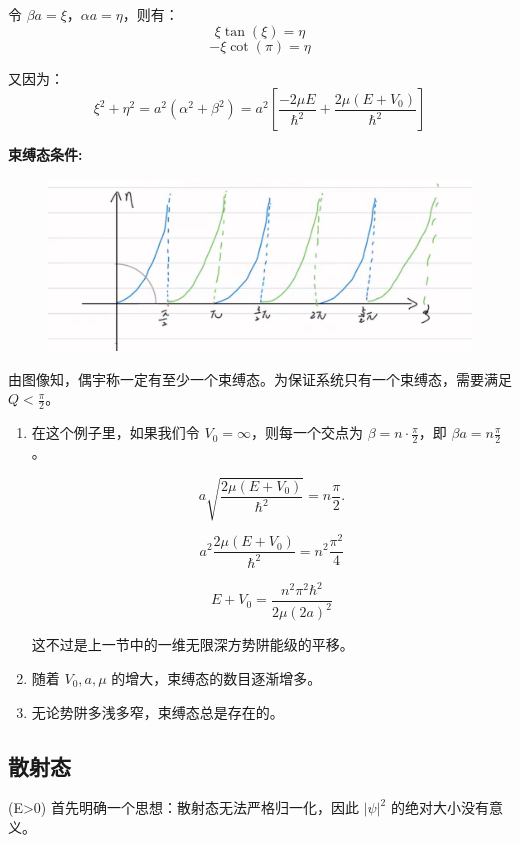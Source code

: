 \documentclass[lang=cn,10pt]{elegantbook}
\begin{document}
\begin{solution}
令 \(\beta a = \xi\)，\(\alpha a = \eta\)，则有：
\[
\xi \tan(\xi) = \eta
\]
\[
-\xi \cot(\pi) = \eta
\]

又因为：
\[
\xi^2 + \eta^2 = a^2 \left( \alpha^2 + \beta^2 \right) = a^2 \left[ \frac{-2\mu E}{\hbar^2} + \frac{2\mu (E + V_0)}{\hbar^2} \right]
\]
	
	\textbf{束缚态条件:}
	
	\begin{figure}[H]
		\centering
		\includegraphics[width=0.7\linewidth]{figure/screenshot0025}
	\end{figure}
	
	由图像知，偶宇称一定有至少一个束缚态。为保证系统只有一个束缚态，需要满足 $Q < \frac{\pi}{2}$。
	
	\begin{enumerate}
		\item 在这个例子里，如果我们令 $V_0 = \infty$，则每一个交点为 $\beta = n \cdot \frac{\pi}{2}$，即 $\beta a = n \frac{\pi}{2}$。
		
		\[
		a \sqrt{\frac{2\mu(E+V_0)}{\hbar^2}} = n \frac{\pi}{2}.
		\]
		
		\[
		a^2 \frac{2\mu(E+V_0)}{\hbar^2} = n^2 \frac{\pi^2}{4}
		\]
		
		\[
		E + V_0 = \frac{n^2 \pi^2 \hbar^2}{2\mu (2a)^2}
		\]
		
		这不过是上一节中的一维无限深方势阱能级的平移。
		
		\item 随着 $V_0, a, \mu$ 的增大，束缚态的数目逐渐增多。
		
		\item 无论势阱多浅多窄，束缚态总是存在的。
	\end{enumerate}
\end{solution}
\subsection{散射态}
(E>0)
首先明确一个思想：散射态无法严格归一化，因此 $|\psi|^2$ 的绝对大小没有意义。
\end{document}
